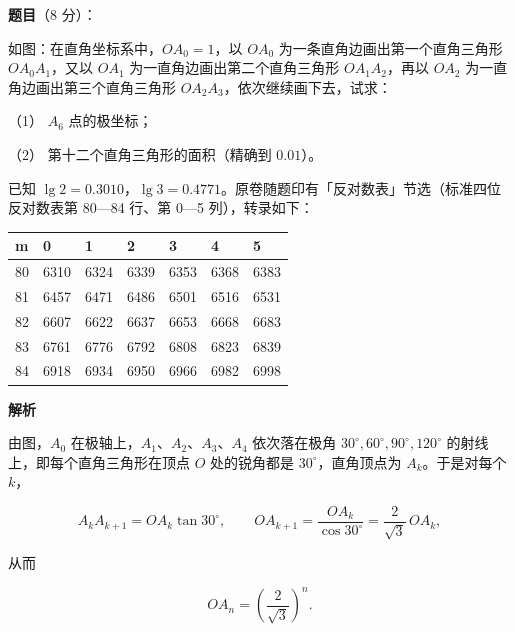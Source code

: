 \begin{answer}

\textbf{题目}（8 分）：

如图：在直角坐标系中，$OA_0=1$，以 $OA_0$ 为一条直角边画出第一个直角三角形 $OA_0A_1$，又以 $OA_1$ 为一直角边画出第二个直角三角形 $OA_1A_2$，再以 $OA_2$ 为一直角边画出第三个直角三角形 $OA_2A_3$，依次继续画下去，试求：
\nopagebreak[4]
\begin{center}\end{center}
\nopagebreak[4]
（1） $A_6$ 点的极坐标；

（2） 第十二个直角三角形的面积（精确到 $0.01$）。

已知 $\lg2=0.3010$，$\lg3=0.4771$。原卷随题印有「反对数表」节选（标准四位反对数表第 80—84 行、第 0—5 列），转录如下：

\begin{center}
\begin{tabular}{lllllll}
\toprule
m & 0 & 1 & 2 & 3 & 4 & 5 \\
\midrule
80 & 6310 & 6324 & 6339 & 6353 & 6368 & 6383 \\
81 & 6457 & 6471 & 6486 & 6501 & 6516 & 6531 \\
82 & 6607 & 6622 & 6637 & 6653 & 6668 & 6683 \\
83 & 6761 & 6776 & 6792 & 6808 & 6823 & 6839 \\
84 & 6918 & 6934 & 6950 & 6966 & 6982 & 6998 \\
\bottomrule
\end{tabular}
\end{center}

\textbf{解析}
\nopagebreak[4]
\begin{center}\end{center}
\nopagebreak[4]
由图，$A_0$ 在极轴上，$A_1\text{、}A_2\text{、}A_3\text{、}A_4$ 依次落在极角 $30^\circ,60^\circ,90^\circ,120^\circ$ 的射线上，即每个直角三角形在顶点 $O$ 处的锐角都是 $30^\circ$，直角顶点为 $A_k$。于是对每个 $k$，

\nopagebreak[4]
\[
A_kA_{k+1}=OA_k\tan30^\circ,\qquad
OA_{k+1}=\frac{OA_k}{\cos30^\circ}=\frac{2}{\sqrt{3}}\,OA_k,
\]

从而

\nopagebreak[4]
\[
OA_n=\left(\frac{2}{\sqrt{3}}\right)^{n}.
\]



\end{answer}
